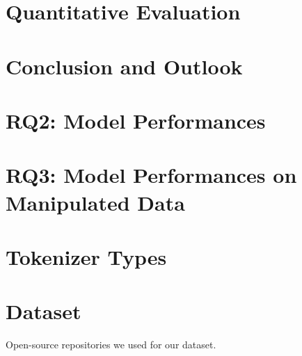\documentclass[
     12pt,                    %
     a4paper,             %
     BCOR10mm,     %
     DIV14,                 %
     listof=totoc,                    %
     bibliography=totoc,       %
     index=totoc,              %
     twoside,
     headsepline
     ]{scrreprt}
\begin{document}
\chapter{Quantitative Evaluation}\label{chap:evaluation}



\chapter{Conclusion and Outlook}\label{chap:conclusion}


  

\clearpage




\appendix
\appendixpage
\addappheadtotoc
\setcounter{table}{0}
\renewcommand{\thetable}{A\arabic{table}}

\chapter{RQ2: Model Performances}

\chapter{RQ3: Model Performances on Manipulated Data}

\chapter{Tokenizer Types}

\chapter{Dataset}
\begin{table}[h]
     \footnotesize
     \caption{Open-source repositories we used for our dataset. }
     \label{tab:repos_hashes}
\end{table}
\end{document}
